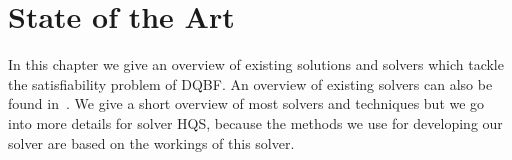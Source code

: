 \documentclass[
  digital, %
  twoside, %
  table,   %
  nolof,     %
  nolot,     %
]{fithesis3}
\theoremstyle{definition}
\theoremstyle{remark}
\begin{document}
\chapter{State of the Art}




In this chapter we give an overview of existing solutions and solvers which tackle the satisfiability problem of DQBF. An overview of existing solvers can also be found in~\cite{DQBFStateOfArtTalk,DQBFStateOfArt,DQBFStateOfArtNew}. We give a short overview of most solvers and techniques but %
we go into more details for solver HQS, because the methods we use for developing our solver are based on the workings of this solver.


\end{document}
